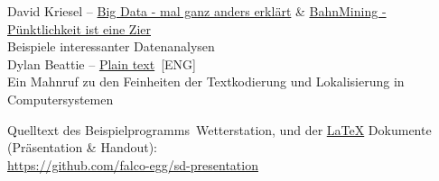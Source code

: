 \documentclass[ngerman]{handout}
\begin{document}
  David Kriesel -- \href{https://youtu.be/\_Pd5sXXMMLI}{Big Data - mal ganz anders erklärt} \& \href{https://youtu.be/0rb9CfOvojk}{BahnMining - Pünktlichkeit ist eine Zier}\\
  \hspace*{1em} {\footnotesize Beispiele interessanter Datenanalysen}\\

  Dylan Beattie -- \href{https://youtu.be/gd5uJ7Nlvvo}{Plain text}~[ENG]\\
  \hspace*{1em} {\footnotesize Ein Mahnruf zu den Feinheiten der Textkodierung und Lokalisierung in Computersystemen}\\

  \printbibliography[heading=none]

  Quelltext des Beispielprogramms~Wetterstation, und der \href{https://www.latex-project.org/}{\LaTeX} Dokumente (Präsentation \& Handout):\\
  \hspace*{1em} \url{https://github.com/falco-egg/sd-presentation}

  \fancyfoot[L]{\framebox[.9\linewidth][l]{\doclicenseText \hfill \doclicenseIcon}}%
\end{document}
